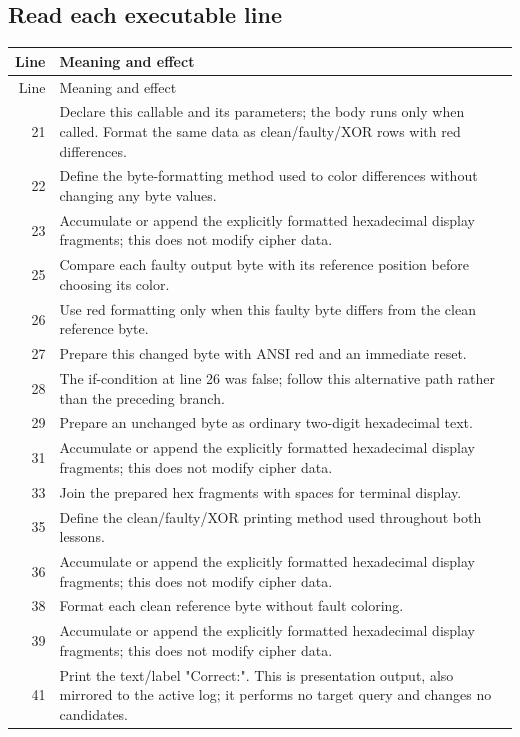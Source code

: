 \subsection*{Read each executable line}
\begingroup\small\begin{longtable}{r >{\raggedright\arraybackslash}p{138mm}}\toprule Line&Meaning and effect\\\midrule\endfirsthead\toprule Line&Meaning and effect\\\midrule\endhead
21&Declare this callable and its parameters; the body runs only when called. Format the same data as clean/faulty/XOR rows with red differences.\\
22&Define the byte-formatting method used to color differences without changing any byte values.\\
23&Accumulate or append the explicitly formatted hexadecimal display fragments; this does not modify cipher data.\\
25&Compare each faulty output byte with its reference position before choosing its color.\\
26&Use red formatting only when this faulty byte differs from the clean reference byte.\\
27&Prepare this changed byte with ANSI red and an immediate reset.\\
28&The if-condition at line 26 was false; follow this alternative path rather than the preceding branch.\\
29&Prepare an unchanged byte as ordinary two-digit hexadecimal text.\\
31&Accumulate or append the explicitly formatted hexadecimal display fragments; this does not modify cipher data.\\
33&Join the prepared hex fragments with spaces for terminal display.\\
35&Define the clean/faulty/XOR printing method used throughout both lessons.\\
36&Accumulate or append the explicitly formatted hexadecimal display fragments; this does not modify cipher data.\\
38&Format each clean reference byte without fault coloring.\\
39&Accumulate or append the explicitly formatted hexadecimal display fragments; this does not modify cipher data.\\
41&Print the text/label "Correct:". This is presentation output, also mirrored to the active log; it performs no target query and changes no candidates.\\

\end{longtable}
